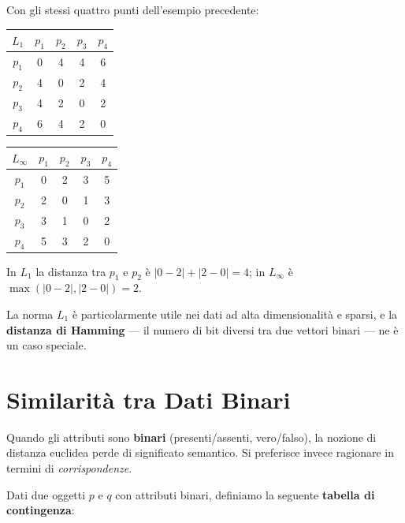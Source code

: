 \begin{example}
Con gli stessi quattro punti dell'esempio precedente:

\begin{center}
\small
\begin{tabular}{c | c c c c}
\toprule
$L_1$ & $p_1$ & $p_2$ & $p_3$ & $p_4$ \\
\midrule
$p_1$ & 0 & 4 & 4 & 6 \\
$p_2$ & 4 & 0 & 2 & 4 \\
$p_3$ & 4 & 2 & 0 & 2 \\
$p_4$ & 6 & 4 & 2 & 0 \\
\bottomrule
\end{tabular}
\hspace{1cm}
\begin{tabular}{c | c c c c}
\toprule
$L_\infty$ & $p_1$ & $p_2$ & $p_3$ & $p_4$ \\
\midrule
$p_1$ & 0 & 2 & 3 & 5 \\
$p_2$ & 2 & 0 & 1 & 3 \\
$p_3$ & 3 & 1 & 0 & 2 \\
$p_4$ & 5 & 3 & 2 & 0 \\
\bottomrule
\end{tabular}
\end{center}

In $L_1$ la distanza tra $p_1$ e $p_2$ è $|0-2|+|2-0|=4$; in $L_\infty$ è $\max(|0-2|, |2-0|)=2$.
\end{example}

La norma $L_1$ è particolarmente utile nei dati ad alta dimensionalità e sparsi, e la \textbf{distanza di Hamming} — il numero di bit diversi tra due vettori binari — ne è un caso speciale.

\section{Similarità tra Dati Binari}
\label{sec:binary-similarity}

Quando gli attributi sono \textbf{binari} (presenti/assenti, vero/falso), la nozione di distanza euclidea perde di significato semantico. Si preferisce invece ragionare in termini di \textit{corrispondenze}.

Dati due oggetti $p$ e $q$ con attributi binari, definiamo la seguente \textbf{tabella di contingenza}:

